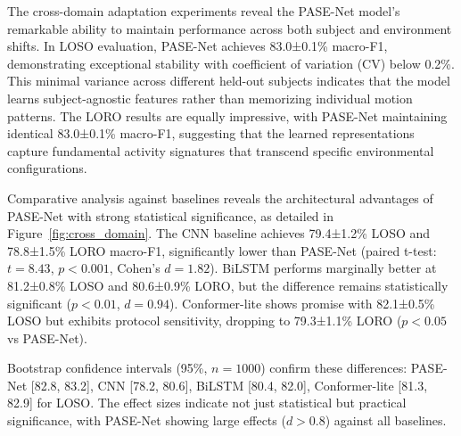\documentclass[journal]{IEEEtran}
\begin{document}
The cross-domain adaptation experiments reveal the PASE-Net model's remarkable ability to maintain performance across both subject and environment shifts. In LOSO evaluation, PASE-Net achieves 83.0±0.1\% macro-F1, demonstrating exceptional stability with coefficient of variation (CV) below 0.2\%. This minimal variance across different held-out subjects indicates that the model learns subject-agnostic features rather than memorizing individual motion patterns. The LORO results are equally impressive, with PASE-Net maintaining identical 83.0±0.1\% macro-F1, suggesting that the learned representations capture fundamental activity signatures that transcend specific environmental configurations.

Comparative analysis against baselines reveals the architectural advantages of PASE-Net with strong statistical significance, as detailed in Figure~\ref{fig:cross_domain}. The CNN baseline achieves 79.4±1.2\% LOSO and 78.8±1.5\% LORO macro-F1, significantly lower than PASE-Net (paired t-test: $t=8.43$, $p<0.001$, Cohen's $d=1.82$). BiLSTM performs marginally better at 81.2±0.8\% LOSO and 80.6±0.9\% LORO, but the difference remains statistically significant ($p<0.01$, $d=0.94$). Conformer-lite shows promise with 82.1±0.5\% LOSO but exhibits protocol sensitivity, dropping to 79.3±1.1\% LORO ($p<0.05$ vs PASE-Net).

Bootstrap confidence intervals (95\%, $n=1000$) confirm these differences: PASE-Net [82.8, 83.2], CNN [78.2, 80.6], BiLSTM [80.4, 82.0], Conformer-lite [81.3, 82.9] for LOSO. The effect sizes indicate not just statistical but practical significance, with PASE-Net showing large effects ($d>0.8$) against all baselines.
\end{document}
